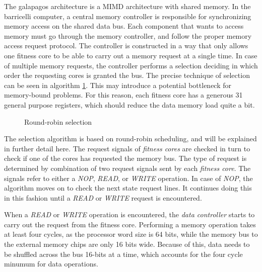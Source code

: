 The \gls{galapagos} architecture is a \gls{MIMD} architecture with shared memory.
In the \Gls{barricelli} computer, a central memory controller is responsible for synchronizing memory access on the shared data bus.
Each component that wants to access memory must go through the memory controller, and follow the proper memory access request protocol.
The controller is constructed in a way that only allows one fitness core to be able to carry out a memory request at a single time.
In case of multiple memory requests, the controller performs a selection deciding in which order the requesting cores is granted the bus.
The precise technique of selection can be seen in algorithm \ref{algorithm:round-robin-selection}.
This may introduce a potential bottleneck for memory-bound problems.
For this reason, each fitness core has a generous 31 general purpose registers, which should reduce the data memory load quite a bit.

\begin{figure}[H]
\begin{algorithm}[H]
\SetAlgoLined
\DontPrintSemicolon
{}
\caption{Round-robin selection}
\label{algorithm:round-robin-selection}
\end{algorithm}
\end{figure}


The selection algorithm is based on round-robin scheduling, and will be explained in further detail here.
The request signals of \emph{fitness cores} are checked in turn to check if one of the cores has requested the memory bus.
The type of request is determined by combination of two request signals sent by each \emph{fitness core}.
The signals refer to either a \emph{NOP}, \emph{READ}, or \emph{WRITE} operation.
In case of \emph{NOP}, the algorithm moves on to check the next state request lines.
It continues doing this in this fashion until a \emph{READ} or \emph{WRITE} request is encountered. 

When a \emph{READ} or \emph{WRITE} operation is encountered, the \emph{data controller} starts to carry out the request from the fitness core.
Performing a memory operation takes at least four cycles, as the processor word size is 64 bits, while the memory bus to the external memory chips are only 16 bits wide.
Because of this, data needs to be shuffled across the bus 16-bits at a time, which accounts for the four cycle minumum for data operations.

